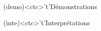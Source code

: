 \documentclass[../../main/main.tex]{subfiles}
\begin{document}
\begin{tcn}[%
		sidebyside, fontupper=\small, fontlower=\small
	]
	\begin{tcn}[nsp](demo)<ctc>'t'{Démonstrations}
	\end{tcn}
	\begin{tcn}[nsp](inte)<ctc>'t'{Interprétations}
	\end{tcn}

\end{tcn}
\end{document}
